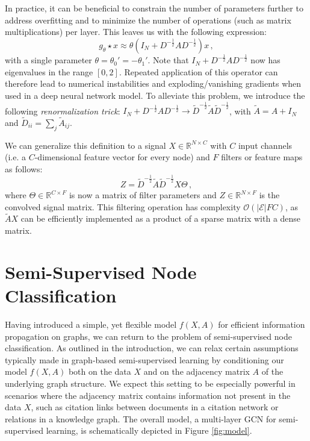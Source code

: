 \documentclass{article} %
\makeatletter
\newcommand*{\ie}{i.e.\@\xspace}
\makeatother
\begin{document}
In practice, it can be beneficial to constrain the number of parameters further to address overfitting and to minimize the number of operations (such as matrix multiplications) per layer. This leaves us with the following expression:
\begin{equation}
  g_{\theta} \star x \approx  \theta \left(I_N + D^{-\frac{1}{2}}AD^{-\frac{1}{2}}\right) x \, ,
\label{eq:fourier-conv-approx3}
\end{equation}
with a single parameter $\theta = \theta_0'=-\theta_1'$. Note that $I_N + D^{-\frac{1}{2}}AD^{-\frac{1}{2}}$ now has eigenvalues in the range $[0, 2]$. Repeated application of this operator can therefore lead to numerical instabilities and exploding/vanishing gradients when used in a deep neural network model. To alleviate this problem, we introduce the following \textit{renormalization trick}: $I_N + D^{-\frac{1}{2}}AD^{-\frac{1}{2}}\rightarrow \tilde{D}^{-\frac{1}{2}}\tilde{A}\tilde{D}^{-\frac{1}{2}}$, with $\tilde{A} = A + I_N$ and $\tilde{D}_{ii} = \sum_j \tilde{A}_{ij}$.

We can generalize this definition to a signal $X\in\mathbb{R}^{N\times C}$ with $C$ input channels (\ie a $C$-dimensional feature vector for every node) and $F$ filters or feature maps as follows:
\begin{equation}
  Z = \tilde{D}^{-\frac{1}{2}}\tilde{A}\tilde{D}^{-\frac{1}{2}}X\Theta \, ,
\label{eq:fourier-conv-approx4}
\end{equation}
where $\Theta\in\mathbb{R}^{C\times F}$ is now a matrix of filter parameters and $Z\in\mathbb{R}^{N\times F}$ is the convolved signal matrix. This filtering operation has complexity $\mathcal{O}(|\mathcal{E}|FC)$, as $\tilde{A}X$ can be efficiently implemented as a product of a sparse matrix with a dense matrix.


\section{Semi-Supervised Node Classification}
Having introduced a simple, yet flexible model $f(X,A)$ for efficient information propagation on graphs, we can return to the problem of semi-supervised node classification. As outlined in the introduction, we can relax certain assumptions typically made in graph-based semi-supervised learning by conditioning our model $f(X,A)$ both on the data $X$ and on the adjacency matrix $A$ of the underlying graph structure. We expect this setting to be especially powerful in scenarios where the adjacency matrix contains information not present in the data $X$, such as citation links between documents in a citation network or relations in a knowledge graph. The overall model, a multi-layer GCN for semi-supervised learning, is schematically depicted in Figure \ref{fig:model}.
\end{document}
